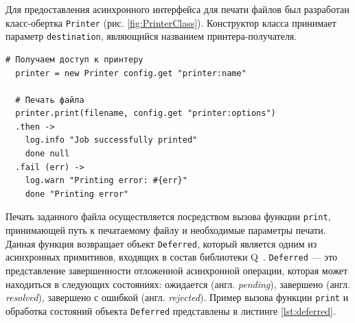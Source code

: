 \documentclass[a4paper,14pt,href,draft]{article}
\begin{document}
Для предоставления асинхронного интерфейса для печати файлов был разработан класс-обертка \texttt{Printer} (рис.
\ref{fig:PrinterClass}). Конструктор класса принимает параметр \texttt{destination}, являющийся названием
принтера-получателя.


\begin{lstlisting}[caption=Печать файла с помощью класса \texttt{Printer}, label=lst:deferred]
  # Получаем доступ к принтеру
  printer = new Printer config.get "printer:name"

  # Печать файла
  printer.print(filename, config.get "printer:options")
  .then ->
    log.info "Job successfully printed"
    done null
  .fail (err) ->
    log.warn "Printing error: #{err}"
    done "Printing error"
\end{lstlisting}


Печать заданного файла осуществляется посредством вызова функции \texttt{print}, принимающей путь к печатаемому файлу и
необходимые параметры печати. Данная функция возвращает объект \texttt{Deferred}, который является одним из асинхронных
примитивов, входящих в состав библиотеки Q~\cite{QLibrary}. \texttt{Deferred} --- это представление завершенности отложенной
асинхронной операции, которая может находиться в следующих состояниях: ожидается (англ. \textit{pending}),
завершено (англ. \textit{resolved}), завершено с ошибкой (англ. \textit{rejected}). Пример вызова функции \texttt{print}
и обработка состояний объекта \texttt{Deferred} представлены в листинге \ref{lst:deferred}.
\end{document}
